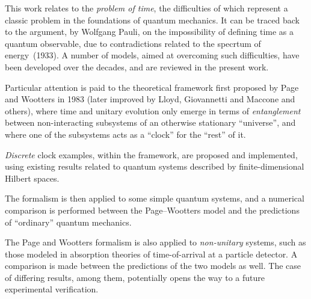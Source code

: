 This work relates to the
\emph{problem of time},
the difficulties of which
represent a classic problem in the foundations of quantum mechanics.
It can be traced back to
the argument, by Wolfgang Pauli,
on the impossibility of defining time as a quantum observable,
due to contradictions related to the specrtum of energy~(1933).
A number of models, aimed at overcoming such difficulties,
have been developed over the decades,
and are reviewed in the present work.

Particular attention is paid to 
the theoretical framework first proposed by Page and Wootters in 1983
(later improved by Lloyd, Giovannetti and Maccone and others),
where time and unitary evolution only emerge in
terms of \emph{entanglement} between non-interacting subsystems
of an otherwise stationary ``universe'',
and where one of the subsystems acts as a ``clock'' for the ``rest'' of it.

\emph{Discrete} clock examples, within the framework, are proposed and implemented,
using
existing results related to quantum systems described by finite-dimensional Hilbert spaces.

The formalism is then applied to some simple quantum systems,
and a numerical comparison is performed between the Page--Wootters model and the predictions
of ``ordinary'' quantum mechanics.

The Page and Wootters formalism is also applied to \emph{non-unitary} systems,
such as those modeled in absorption theories of time-of-arrival at a particle detector.
A comparison is made between the predictions of the two models as well.
The case of differing results, among them, potentially opens the way to a future experimental verification.